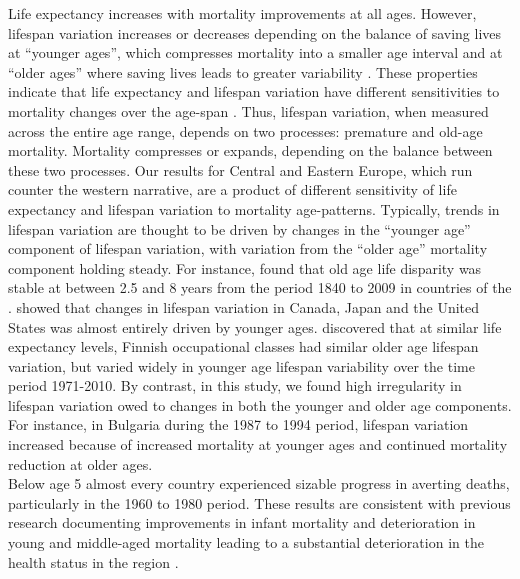 \documentclass{article}
\begin{document}
\begin{spacing}{1.5}
Life expectancy increases with mortality improvements at all ages. However, lifespan variation increases or decreases depending on the balance of saving lives at ``younger ages'', which compresses mortality into a smaller age interval and at ``older ages'' where saving lives leads to greater variability \citep{zhang2009, gillespie2014divergence}. These properties indicate that life expectancy and lifespan variation have different sensitivities to mortality changes over the age-span \citep{vanraalte2013}. Thus, lifespan variation, when measured across the entire age range, depends on two processes: premature and old-age mortality. Mortality compresses or expands, depending on the balance between these two processes. Our results for Central and Eastern Europe, which run counter the western narrative, are a product of different sensitivity of life expectancy and lifespan variation to mortality age-patterns.  Typically, trends in lifespan variation are thought to be driven by changes in the ``younger age'' component of lifespan variation, with variation from the ``older age'' mortality component holding steady. For instance, \citet{vaupel2011} found that old age life disparity was stable at between 2.5 and 8 years from the period 1840 to 2009 in countries of the \cite{HMD}. \citet{gillespie2014divergence} showed that changes in lifespan variation in Canada, Japan and the United States was almost entirely driven by younger ages. \citet{vanraalte2014} discovered that at similar life expectancy levels, Finnish occupational classes had similar older age lifespan variation, but varied widely in younger age lifespan variability over the time period 1971-2010. By contrast, in this study, we found high irregularity in lifespan variation owed to changes in both the younger and older age components. For instance, in Bulgaria during the 1987 to 1994 period, lifespan variation increased because of increased mortality at younger ages and continued mortality reduction at older ages.\\

Below age 5 almost every country experienced sizable progress in averting deaths, particularly in the 1960 to 1980 period. These results are consistent with previous research documenting improvements in infant mortality and deterioration in young and middle-aged mortality leading to a substantial deterioration in the health status in the region \citep{chenet1996}. \\


\end{spacing}
\end{document}
